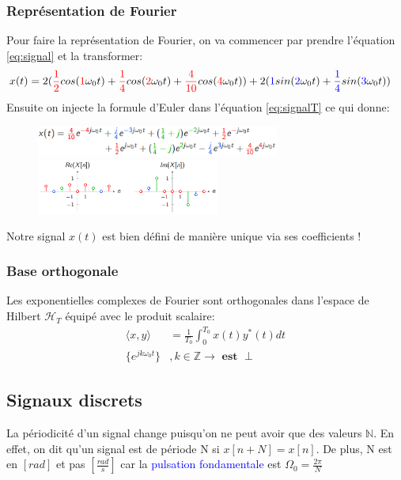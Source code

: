 \documentclass{report}
\begin{document}
\subsubsection{Représentation de Fourier} %
Pour faire la représentation de Fourier, on va commencer par prendre l'équation \ref{eq:signal} et la transformer:
\begin{align}
x(t) &= 2(\textcolor{red}{\frac{1}{2}}cos(\textcolor{red}{1}\omega_0t) + \textcolor{red}{\frac{1}{4}}cos(\textcolor{red}{2}\omega_0t) + \textcolor{red}{\frac{4}{10}}cos(\textcolor{red}{4}\omega_0t)) + 2(\textcolor{blue}{1}sin(\textcolor{blue}{2}\omega_0t)  + \textcolor{blue}{\frac{1}{4}}sin(\textcolor{blue}{3}\omega_0t)) \label{eq:signalT}
\end{align}
Ensuite on injecte la formule d'Euler dans l'équation \ref{eq:signalT} ce qui donne:
\begin{figure}[H]
\centering
\includegraphics[width=8cm]{img/signalTE.png} %
\includegraphics[width=6cm]{img/grapheSignalTE.png}
\end{figure}
Notre signal $x(t)$ est bien défini de manière unique via ses coefficients !


\subsubsection{Base orthogonale}
Les exponentielles complexes de Fourier sont orthogonales dans l'espace de Hilbert $\mathcal{H}_T$ équipé avec le produit scalaire:
\begin{align}
\langle x, y\rangle &= \frac{1}{T_0}\int_0^{T_0}x(t)y^{*}(t)dt\\
\{e^{jk\omega_0t}\}&, k \in \mathbb{Z} \rightarrow \textbf{ est }\perp
\end{align}

\subsection{Signaux discrets}
La périodicité d'un signal change puisqu'on ne peut avoir que des valeurs $\mathbb{N}$. En effet, on dit qu'un signal est de période N si $x[n + N] = x[n]$. De plus, N est en $[rad]$ et pas $[\frac{rad}{s}]$ car la \textcolor{blue}{pulsation fondamentale} est $\Omega_0 = \frac{2\pi}{N}$
\end{document}
